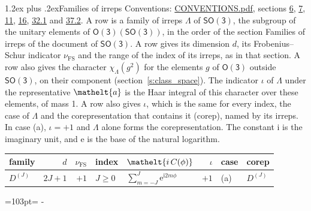 \documentclass[10pt,a4paper]{article}
\makeatletter
\renewcommand\section{\@startsection{section}{1}{\z@}{-3ex plus -1ex minus -.2ex}%
  {1.2ex plus .2ex}{\normalfont\large\sffamily\bfseries\color{parttitle}}}
\newcommand{\needspace}[1]{\par\penalty-100\begingroup\dimen0=#1\relax\dimen2=\pagegoal
  \advance\dimen2-\pagetotal\ifdim\dimen0>\dimen2\relax\ifdim\dimen2>0pt\vfil\break\fi\fi
  \endgroup}
\numberwithin{equation}{section}
\newcommand{\eltfont}[1]{{\let\sigma\eltsigma\mathelt{#1}}}
\newcommand{\grp}[1]{\mathsf{#1}}
\newcommand{\comp}[1]{\eltfont{#1}}
\newcommand{\elt}[1]{\eltfont{#1}}
\newcommand{\iunit}{\mathrm{i}}
\newcommand{\expe}{\mathrm{e}}
\newcommand{\irrJ}[1]{D^{(#1)}}
\newcommand{\irchar}[1]{\chi_{#1}}
\newcommand{\fsind}{\nu_{\mathrm{FS}}}
\makeatother
\begin{document}
\section{Families of irreps}\label{s:families}
Conventions: \href{../../CONVENTIONS.pdf}{CONVENTIONS.pdf}, sections \href{../../../rotation/CONVENTIONS.pdf\#conv.6}{6}, \href{../../../rotation/CONVENTIONS.pdf\#conv.7}{7}, \href{../../../rotation/CONVENTIONS.pdf\#conv.11}{11}, \href{../../../rotation/CONVENTIONS.pdf\#conv.16}{16}, \href{../../CONVENTIONS.pdf\#conv.32.1}{32.1} and \href{../../CONVENTIONS.pdf\#conv.37.2}{37.2}.
\leavevmode\label{n:irrep.Delta}\label{n:head.family.irreps}A row is a family of irreps $\Lambda$ of $\grp{SO(3)}$, the subgroup of the unitary elements of $\grp{O(3)}(\grp{SO(3)})$, in the order of the section Families of irreps of the document of \href{../../../rotation/data/pdf/SO3.pdf}{$\grp{SO(3)}$}. \label{n:index.dimension}\label{n:index.frobenius}\label{n:head.index.family}A row gives its dimension $d$, its Frobenius--Schur indicator $\fsind$ and the range of the index of its irreps, as in that section. \label{n:function.character}A row also gives the character $\irchar{\Lambda}(g^2)$ for the elements $g$ of $\grp{O(3)}$ outside $\grp{SO(3)}$, on their component (section~\ref{s:class_space}). The indicator $\iota$ of $\Lambda$ under the representative $\elt{a}$ is the Haar integral of this character over these elements, of mass 1. \label{n:head.case.corep}\label{n:head.corep}A row also gives $\iota$, which is the same for every index, the case of $\Lambda$ and the corepresentation that contains it (corep), named by its irreps. In case (a), $\iota = +1$ and $\Lambda$ alone forms the corepresentation.
The constant $\iunit$ is the imaginary unit, and $\expe$ is the base of the natural logarithm.
{\small\renewcommand{\arraystretch}{1.25}\begin{longtable}{@{}lrrllrll@{}}\toprule
family & $d$ & $\fsind$ & index & $\comp{i\,C(\phi)}$ & $\iota$ & case & corep\\\midrule\endhead
\bottomrule\endfoot\endlastfoot
$\irrJ{J}$ & $2J+1$ & $+1$ & $J \ge 0$ & $\sum_{m=-J}^{J}\expe^{\iunit 2m\phi}$ & $+1$ & (a) & $\irrJ{J}$\\
\bottomrule\end{longtable}}
\needspace{103pt}
\end{document}

